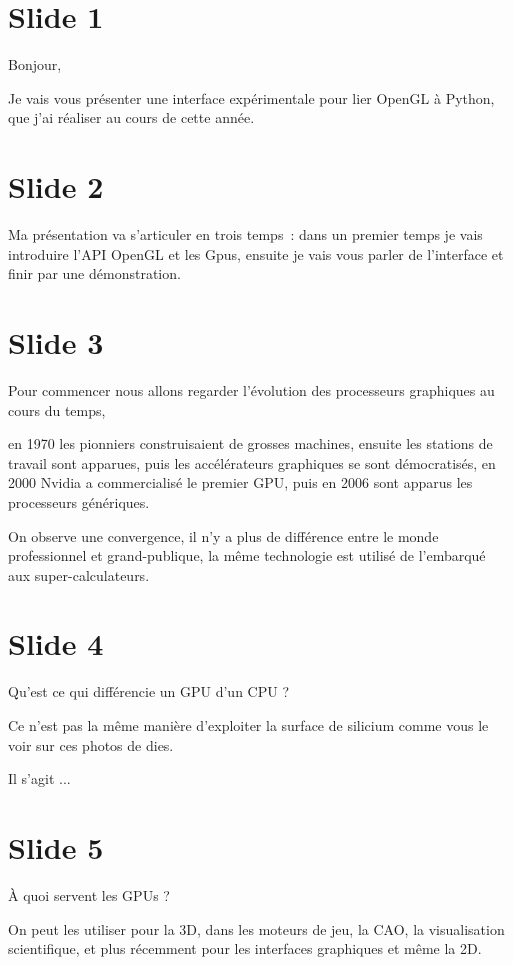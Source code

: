 \documentclass[12pt]{article}
\begin{document}
\section{Slide 1}

Bonjour, 

Je vais vous présenter une interface expérimentale pour lier OpenGL à Python,
que j'ai réaliser au cours de cette année.

\section{Slide 2}

Ma présentation va s'articuler en trois temps~:
  dans un premier temps je vais introduire l'API OpenGL et les Gpus,
  ensuite je vais vous parler de l'interface
  et finir par une démonstration.

\section{Slide 3}

Pour commencer nous allons regarder l'évolution des processeurs graphiques au cours du temps,

en 1970 les pionniers construisaient de grosses machines,
ensuite les stations de travail sont apparues,
puis les accélérateurs graphiques se sont démocratisés,
en 2000 Nvidia a commercialisé le premier GPU,
puis en 2006 sont apparus les processeurs génériques.

On observe une convergence, il n'y a plus de différence entre le monde professionnel et grand-publique,
la même technologie est utilisé de l'embarqué aux super-calculateurs.

\section{Slide 4}

Qu'est ce qui différencie un GPU d'un CPU ?

Ce n'est pas la même manière d'exploiter la surface de silicium comme vous le voir sur ces photos de
dies.

Il s'agit ...

\section{Slide 5}

À quoi servent les GPUs ?

On peut les utiliser pour la 3D, dans les moteurs de jeu, la CAO, la visualisation scientifique, et
plus récemment pour les interfaces graphiques et même la 2D.
\end{document}

